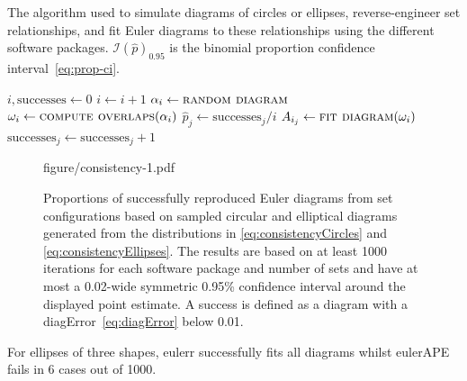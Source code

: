 \documentclass[
  oneside,
  openany,
  numbers=noendperiod,
  parskip=half,
  bibliography=totoc
]{scrbook}\usepackage[]{graphicx}\usepackage{xcolor}
\newcommand{\pkg}[1]{{\fontseries{b}\selectfont #1}}
\begin{document}
\begin{algorithm}[  hbtp]
\caption{The algorithm used to simulate diagrams of circles or ellipses,
reverse-engineer set relationships,
and fit Euler diagrams to these relationships using the different software packages.
$\mathcal{I}(\hat{p})_{0.95}$ is the binomial proportion confidence
interval~\eqref{eq:prop-ci}.\label{alg:consistency}}
\begin{algorithmic}
  \State $i, \text{successes} \gets 0$
  \Do
    \State $i \gets i + 1$
    \State $\alpha_i \gets \Call{random diagram}{}$
    \State $\omega_i \gets \Call{compute overlaps}{\alpha_i}$
      \State $\hat{p}_j \gets \text{successes}_j/i$
        \State $A_{i_j} \gets \Call{fit diagram}{\omega_i}$
          \State $\text{successes}_j \gets \text{successes}_j + 1$
        \EndIf
      \EndIf
    \EndFor
\EndFor
\end{algorithmic}
\end{algorithm}

\begin{figure}[bhtp]
figure/consistency-1.pdf
\caption{Proportions of successfully reproduced Euler diagrams from
set configurations based on sampled circular and elliptical diagrams generated from the
distributions in \eqref{eq:consistencyCircles} and \eqref{eq:consistencyEllipses}.
The results are based on at least 1000 iterations for each
software package and number of sets and have at most a 0.02-wide
symmetric 0.95\% confidence interval around the displayed point estimate. A
success is defined as a diagram with a diagError~\eqref{eq:diagError} below
0.01.}
\label{fig:consistency}
\end{figure}

For ellipses of three shapes, \pkg{eulerr} successfully fits all diagrams
whilst \pkg{eulerAPE} fails in
6
cases out of 1000.
\end{document}
